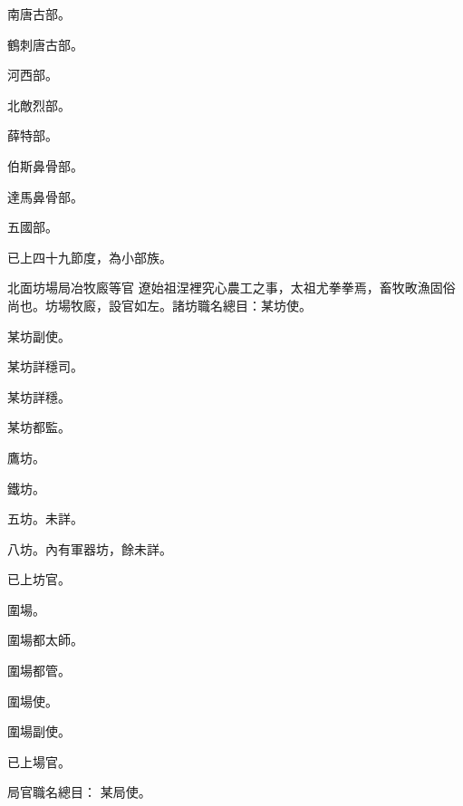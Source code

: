 \begin{pinyinscope}
 南唐古部。



 鶴刺唐古部。



 河西部。



 北敵烈部。



 薛特部。



 伯斯鼻骨部。



 達馬鼻骨部。



 五國部。



 已上四十九節度，為小部族。



 北面坊場局冶牧廄等官
 遼始祖涅裡究心農工之事，太祖尤拳拳焉，畜牧畋漁固俗尚也。坊場牧廄，設官如左。諸坊職名總目：某坊使。



 某坊副使。



 某坊詳穩司。



 某坊詳穩。



 某坊都監。



 鷹坊。



 鐵坊。



 五坊。未詳。



 八坊。內有軍器坊，餘未詳。



 已上坊官。



 圍場。



 圍場都太師。



 圍場都管。



 圍場使。



 圍場副使。



 已上場官。



 局官職名總目：
 某局使。




\end{pinyinscope}
